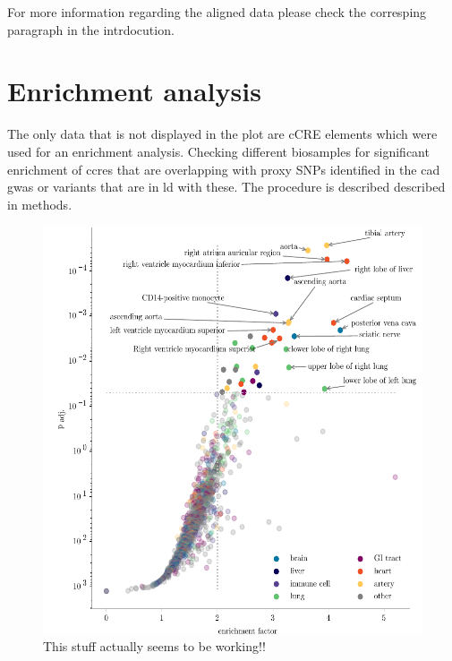     For more information regarding the aligned data please check the corresping paragraph in the intrdocution.

\section{Enrichment analysis}
\label{sec:result_enrichment}
The only data that is not displayed in the plot are cCRE elements which were used for an enrichment analysis. Checking different biosamples for significant enrichment of \acp{ccre} that are overlapping with proxy SNPs identified in the \ac{cad} \ac{gwas} or variants that are in \ac{ld} with these. The procedure is described described in methods.

\begin{figure}[h!]
\capstart
    \centering
	\includegraphics{Abbildung/enrichment_scatter.pdf}

	\begin{minipage}{\captionwidth}
		\caption[enrichemtn]{ \newline This stuff actually seems to be working!!}
		\label{fig:enrichment}
	\end{minipage}
\end{figure}

